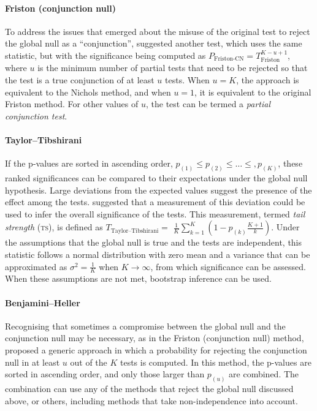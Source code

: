 \paragraph{Friston (conjunction null)} To address the issues that emerged about the misuse of the original test to reject the global null as a ``conjunction'', \citet{Friston2005} suggested another test, which uses the same statistic, but with the significance being computed as $P_{\text{Friston-CN}}=T^{K-u+1}_{\text{Friston}}$, where $u$ is the minimum number of partial tests that need to be rejected so that the test is a true conjunction of at least $u$ tests. When $u=K$, the approach is equivalent to the Nichols method, and when $u=1$, it is equivalent to the original Friston method. For other values of $u$, the test can be termed a \emph{partial conjunction test}.

\paragraph{Taylor--Tibshirani} If the p-values are sorted in ascending order, $p_{(1)} \leqslant p_{(2)} \leqslant \ldots \leqslant, p_{(K)}$, these ranked significances can be compared to their expectations under the global null hypothesis. Large deviations from the expected values suggest the presence of the effect among the tests. \citet{Taylor2006} suggested that a measurement of this deviation could be used to infer the overall significance of the tests. This measurement, termed \emph{tail strength} (\textsc{ts}), is defined as $T_{\text{Taylor--Tibshirani}} =$ $\frac{1}{K} \sum_{k=1}^{K} \left(1-p_{(k)}\frac{K+1}{k}\right)$. Under the assumptions that the global null is true and the tests are independent, this statistic follows a normal distribution with zero mean and a variance that can be approximated as $\sigma^2=\frac{1}{K}$ when $K \rightarrow \infty$, from which significance can be assessed. When these assumptions are not met, bootstrap inference can be used.

\paragraph{Benjamini--Heller} Recognising that sometimes a compromise between the global null and the conjunction null may be necessary, as in the Friston (conjunction null) method, \citet{Benjamini2008} proposed a generic approach in which a probability for rejecting the conjunction null in at least $u$ out of the $K$ tests is computed. In this method, the p-values are sorted in ascending order, and only those larger than $p_{(u)}$ are combined. The combination can use any of the methods that reject the global null discussed above, or others, including methods that take non-independence into account.

